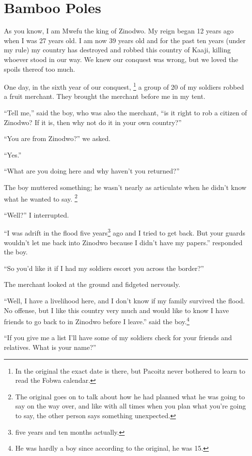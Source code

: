 \chapter{Bamboo Poles}

As you know, I am Mwefu the king of Zinodwo. My reign began 12 years ago when I was 27 years old. I am now 39 years old and for the past ten years (under my rule) my country has destroyed and robbed this country of Kaaji, killing whoever stood in our way.
We knew our conquest was wrong, but we loved the spoils thereof too much.

One day, in the sixth year of our conquest,
\footnote{In the original the exact date is there, but Pacoitz never bothered to learn to read the Fobwa calendar.}
a group of 20 of my soldiers robbed a fruit merchant. They brought the merchant before me in my tent.

``Tell me,'' said the boy, who was also the merchant, ``is it right to rob a citizen of Zinodwo? If it is, then why not do it in your own country?''

``You are from Zinodwo?'' we asked.

``Yes.''

``What are you doing here and why haven't you returned?''

The boy muttered something; he wasn't nearly as articulate when he didn't know what he wanted to say. \footnote{The original goes on to talk about how he had planned what he was going to say on the way over, and like with all times when you plan what you're going to say, the other person says something unexpected.}

``Well?'' I interrupted.

``I was adrift in the flood five years\footnote{five years and ten months actually.} ago and I tried to get back. But your guards wouldn't let me back into Zinodwo because I didn't have my papers.'' responded the boy.

``So you'd like it if I had my soldiers escort you across the border?''

The merchant looked at the ground and fidgeted nervously.

``Well, I have a livelihood here, and I don't know if my family survived the flood. No offense, but I like this country very much and would like to know I have friends to go back to in Zinodwo before I leave.'' said the boy.\footnote{He was hardly a boy since according to the original, he was 15.}

``If you give me a list I'll have some of my soldiers check for your friends and relatives. What is your name?''

